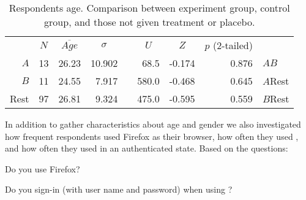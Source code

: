 \newcommand{\threeguides}{%
  \begin{tikzpicture}
    \draw (-1,1) -- (-1,1);
      \draw (-1,0.75) -- (-0.25,0.75);
      \draw (-1,0.225) -- (-0.25,0.75);
      \draw (-1,0.175) -- (-0.25,-0.35);
      \draw (-1,-0.35) -- (-0.25,-0.35);
    \begin{scope}[color=red]
      \draw (-1,0.70) -- (-0.25,0.2);
      \draw (-1,-0.30) -- (-0.25,0.2);
    \end{scope}
    \draw (-1,-1) -- (-1,-1);
  \end{tikzpicture}}

\begin{table}
  \begin{whole}
  \begin{tabular}{rrrrrrrrl}

    &
    \multicolumn{1}{c}{$N$} &
    \multicolumn{1}{c}{$\overline{Age}$} &
    \multicolumn{1}{c}{$\sigma$} &
    &
    \multicolumn{1}{c}{$U$} &
    \multicolumn{1}{c}{$Z$} &
    \multicolumn{1}{c}{$p$ (2-tailed)} \\

    \cmidrule(lr){2-8}

    $A$ &
    13 &
    26.23 &
    10.902 &
    \multirow{3}{*}{\threeguides} &
    68.5 &
    -0.174 &
    0.876 &
    $A$\dash{}$B$ \\

    $B$ &
    11 &
    24.55 &
    7.917 &
    &
    580.0 &
    -0.468 &
    0.645 &
    $A$\dash{}Rest \\

    Rest &
    97 &
    26.81 &
    9.324 &
    &
    475.0 &
    -0.595 &
    0.559 &
    $B$\dash{}Rest \\

  \end{tabular}
  \caption[Respondents Age, Between Groups]{%
    Respondents age. Comparison between
    experiment group, control group, and those not given treatment
    or placebo.
  }
  \label{table:respondents.profile.age}
  \end{whole}
\end{table}

In addition to gather characteristics about age and gender we also
investigated how frequent respondents used Firefox as their browser,
how often they used \urort{}, and how often they used \urort{} in an
authenticated state.
Based on the questions:
\begin{items}
  \item Do you use Firefox{}?
  \item Do you sign-in (with user name and password) when using
    \urort{}?
\end{items}

